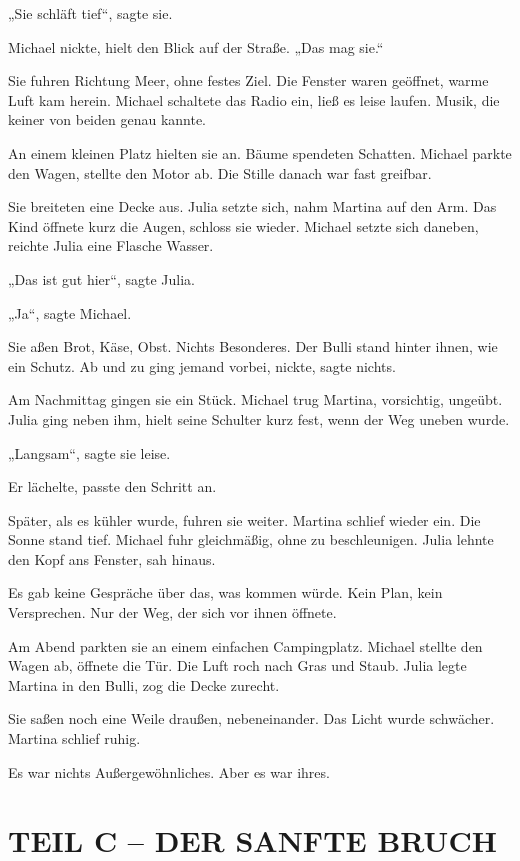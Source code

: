 \documentclass[
]{article}
\begin{document}
„Sie schläft tief``, sagte sie.

Michael nickte, hielt den Blick auf der Straße. „Das mag sie.``

Sie fuhren Richtung Meer, ohne festes Ziel. Die Fenster waren geöffnet, warme Luft kam herein. Michael schaltete das Radio ein, ließ es leise laufen. Musik, die keiner von beiden genau kannte.

An einem kleinen Platz hielten sie an. Bäume spendeten Schatten. Michael parkte den Wagen, stellte den Motor ab. Die Stille danach war fast greifbar.

Sie breiteten eine Decke aus. Julia setzte sich, nahm Martina auf den Arm. Das Kind öffnete kurz die Augen, schloss sie wieder. Michael setzte sich daneben, reichte Julia eine Flasche Wasser.

„Das ist gut hier``, sagte Julia.

„Ja``, sagte Michael.

Sie aßen Brot, Käse, Obst. Nichts Besonderes. Der Bulli stand hinter ihnen, wie ein Schutz. Ab und zu ging jemand vorbei, nickte, sagte nichts.

Am Nachmittag gingen sie ein Stück. Michael trug Martina, vorsichtig, ungeübt. Julia ging neben ihm, hielt seine Schulter kurz fest, wenn der Weg uneben wurde.

„Langsam``, sagte sie leise.

Er lächelte, passte den Schritt an.

Später, als es kühler wurde, fuhren sie weiter. Martina schlief wieder ein. Die Sonne stand tief. Michael fuhr gleichmäßig, ohne zu beschleunigen. Julia lehnte den Kopf ans Fenster, sah hinaus.

Es gab keine Gespräche über das, was kommen würde. Kein Plan, kein Versprechen. Nur der Weg, der sich vor ihnen öffnete.

Am Abend parkten sie an einem einfachen Campingplatz. Michael stellte den Wagen ab, öffnete die Tür. Die Luft roch nach Gras und Staub. Julia legte Martina in den Bulli, zog die Decke zurecht.

Sie saßen noch eine Weile draußen, nebeneinander. Das Licht wurde schwächer. Martina schlief ruhig.

Es war nichts Außergewöhnliches. Aber es war ihres.

\section{TEIL C -- DER SANFTE BRUCH}\label{teil-c-der-sanfte-bruch}
\end{document}
